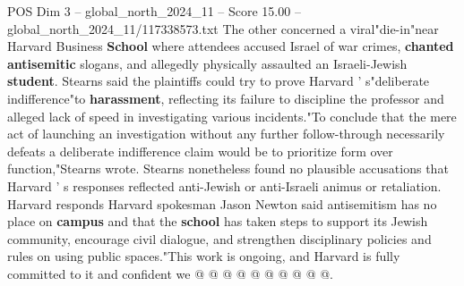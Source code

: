 \begin{textsample}{POS Dim 3 – global\_north\_2024\_11 – Score 15.00 – global\_north\_2024\_11/117338573.txt}
The other concerned a viral"die-in"near Harvard Business \textbf{School} where attendees accused Israel of war crimes, \textbf{chanted} \textbf{antisemitic} slogans, and allegedly physically assaulted an Israeli-Jewish \textbf{student}.
Stearns said the plaintiffs could try to prove Harvard ' s"deliberate indifference"to \textbf{harassment}, reflecting its failure to discipline the professor and alleged lack of speed in investigating various incidents."To conclude that the mere act of launching an investigation without any further follow-through necessarily defeats a deliberate indifference claim would be to prioritize form over function,"Stearns wrote.
Stearns nonetheless found no plausible accusations that Harvard ' s responses reflected anti-Jewish or anti-Israeli animus or retaliation.
Harvard responds Harvard spokesman Jason Newton said antisemitism has no place on \textbf{campus} and that the \textbf{school} has taken steps to support its Jewish community, encourage civil dialogue, and strengthen disciplinary policies and rules on using public spaces."This work is ongoing, and Harvard is fully committed to it and confident we @ @ @ @ @ @ @ @ @ @.

\end{textsample}
